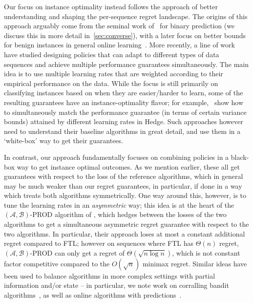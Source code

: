 Our focus on instance optimality instead follows the approach of better understanding and shaping the per-sequence regret landscape. The origins of this approach arguably come from the seminal work of~\cite{Cover1966} for binary prediction (we discuss this in more detail in~\cref{sec:converse}), with a later focus on better bounds for benign instances in general online learning~\citep{Auer--Cesa-Bianchi--Gentile2002,cesa2005minimizing,hazan2010extracting}. More recently, 
a line of work~\citep{Koolen--VanErven--Grunwald2014LLR, VanErven--Grunwald--Mehta--Reid--Williamson2015FastRates, VanErven--Koolen2016Metagrad, gaillard2014second} have studied designing policies that can adapt to different types of data sequences and achieve multiple performance guarantees simultaneously. The main idea is to use multiple learning rates that are weighted according to their empirical performance on the data. While the focus is still primarily on classifying instances based on when they are easier/harder to learn, some of the resulting guarantees have an instance-optimality flavor; for example,~\cite{VanErven--Koolen2016Metagrad} show how to simultaneously match the performance guarantee (in terms of certain variance bounds) attained by different learning rates in Hedge. Such approaches however need to understand their baseline algorithms in great detail, and use them in a `white-box' way to get their guarantees. 

In contrast, our approach fundamentally focuses on combining policies in a black-box way to get instance optimal outcomes. 
As we mention earlier, these all get guarantees with respect to the loss of the reference algorithms, which in general may be much weaker than our regret guarantees, in particular, if done in a way which treats both algorithms symmetrically. One way around this, however, is to tune the learning rates in an \emph{asymmetric} way; this idea is at the heart of the $(\mathcal{A},\mathcal{B})$-PROD algorithm of \cite{sani2014exploiting}, which hedges between the losses of the two algorithms to get a simultaneous  asymmetric
regret guarantee with respect to the two algorithms. In particular, their approach loses at most a constant additional regret compared to FTL; however on sequences where FTL has $\Theta(n)$ regret, $(\mathcal{A},\mathcal{B})$-PROD can only get a regret of $\Theta(\sqrt{n \log n})$, which is not constant factor competitive compared to the $O(\sqrt{n})$ minimax regret.
Similar ideas have been used to balance algorithms in more complex settings with partial information and/or state -- in particular, we note work on corralling bandit algorithms~\cite{agarwal2017corralling,pacchiano2020model,Dann--Wei--Zimmert2023}, as well as online algorithms with predictions~\cite{bamas2020primal,dinitz2022algorithms,anand2022online}.

